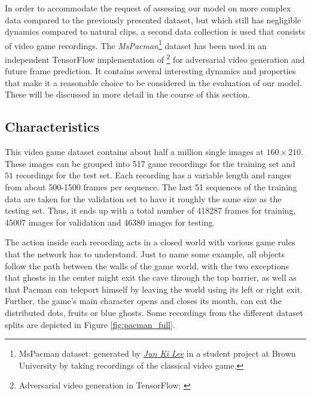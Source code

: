 In order to accommodate the request of assessing our model on more complex data compared to the previously presented dataset, but which still has negligible dynamics compared to natural clips, a second data collection is used that consists of video game recordings. The \textit{MsPacman}\footnote{MsPacman dataset: generated by \href{mailto:jun_ki_lee@brown.edu}{\textit{Jun Ki Lee}} in a student project at Brown University by taking recordings of the classical video game.} dataset has been used in an independent TensorFlow implementation of \parencite{deep_multiscale_video_pred}\footnote{Adversarial video generation in TensorFlow: \parencite{tf_impl_gan}} for adversarial video generation and future frame prediction. It contains several interesting dynamics and properties that make it a reasonable choice to be considered in the evaluation of our model. These will be discussed in more detail in the course of this section.

\subsection{Characteristics}

This video game dataset contains about half a million single images at $ 160 \times 210 $. These images can be grouped into \num{517} game recordings for the training set and $51$ recordings for the test set. Each recording has a variable length and ranges from about \num{500}-\num{1500} frames per sequence. The last \num{51} sequences of the training data are taken for the validation set to have it roughly the same size as the testing set. Thus, it ends up with a total number of \num{418287} frames for training, \num{45007} images for validation and \num{46380} images for testing.

The action inside each recording acts in a closed world with various game rules that the network has to understand. Just to name some example, all objects follow the path between the walls of the game world, with the two exceptions that ghosts in the center might exit the cave through the top barrier, as well as that Pacman can teleport himself by leaving the world using its left or right exit. Further, the game's main character opens and closes its mouth, can eat the distributed dots, fruits or blue ghosts. Some recordings from the different dataset splits are depicted in Figure \ref{fig:pacman_full}.

